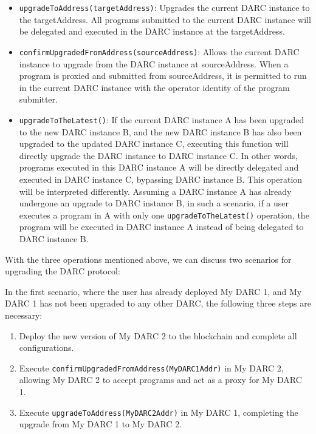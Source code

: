 \documentclass[main.tex]{subfiles}
\begin{document}
\begin{itemize}
    \item \texttt{upgradeToAddress(targetAddress)}: Upgrades the current DARC instance to the targetAddress. All programs submitted to the current DARC instance will be delegated and executed in the DARC instance at the targetAddress.
    
    \item \texttt{confirmUpgradedFromAddress(sourceAddress)}: Allows the current DARC instance to upgrade from the DARC instance at sourceAddress. When a program is proxied and submitted from sourceAddress, it is permitted to run in the current DARC instance with the operator identity of the program submitter.

    \item \texttt{upgradeToTheLatest()}: If the current DARC instance A has been upgraded to the new DARC instance B, and the new DARC instance B has also been upgraded to the updated DARC instance C, executing this function will directly upgrade the DARC instance to DARC instance C. In other words, programs executed in this DARC instance A will be directly delegated and executed in DARC instance C, bypassing DARC instance B. This operation will be interpreted differently. Assuming a DARC instance A has already undergone an upgrade to DARC instance B, in such a scenario, if a user executes a program in A with only one \texttt{upgradeToTheLatest()} operation, the program will be executed in DARC instance A instead of being delegated to DARC instance B.
\end{itemize}

With the three operations mentioned above, we can discuss two scenarios for upgrading the DARC protocol:

In the first scenario, where the user has already deployed My DARC 1, and My DARC 1 has not been upgraded to any other DARC, the following three steps are necessary:

\begin{enumerate}
    \item Deploy the new version of My DARC 2 to the blockchain and complete all configurations.
    \item Execute \texttt{confirmUpgradedFromAddress(MyDARC1Addr)} in My DARC 2, allowing My DARC 2 to accept programs and act as a proxy for My DARC 1.
    \item Execute \texttt{upgradeToAddress(MyDARC2Addr)} in My DARC 1, completing the upgrade from My DARC 1 to My DARC 2.
\end{enumerate}
\end{document}
